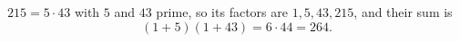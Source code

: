 $215=5\cdot43$ with $5$ and $43$ prime, so its factors are $1,5,43,215$, and their sum is
\[(1+5)(1+43)=6\cdot44=\boxed{264}.\]
